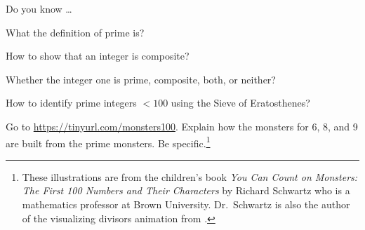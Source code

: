 \begin{exer}[\exerR] %
\label{exer_dyk_primes}
    Do you know \ldots
        \begin{exerpart}
            \item What the definition of prime is?
            \item How to show that an integer is composite?
            \item Whether the integer one is prime, composite, both, or neither?
            \item How to identify prime integers $<100$ using the Sieve of Eratosthenes?
        \end{exerpart}
\end{exer}

        

\begin{exer}[\exerE] %
    Go to \url{https://tinyurl.com/monsters100}.  Explain how the monsters for 6, 8, and 9 are built from the prime monsters.  Be specific.\footnote{These illustrations are from the children's book \emph{You Can Count on Monsters: The First 100 Numbers and Their Characters} by Richard Schwartz who is a mathematics professor at Brown University.  Dr.\ Schwartz is also the author of the visualizing divisors animation from .}   
\end{exer}

